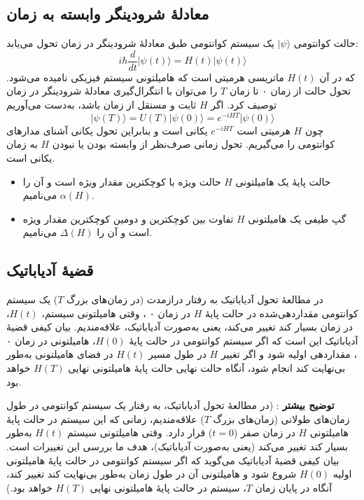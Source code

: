 \subsection{ معادلهٔ شرودینگر وابسته به زمان}
 حالت کوانتومی $|\psi\rangle$ یک سیستم کوانتومی طبق معادلهٔ شرودینگر در زمان تحول می‌یابد:
\begin{equation}
	i\hbar \frac{d}{dt}|\psi(t)\rangle = H(t)|\psi(t)\rangle
\end{equation}
که در آن $H(t)$ ماتریسی هرمیتی است که هامیلتونی سیستم فیزیکی نامیده می‌شود. تحول حالت از زمان ۰ تا زمان $T$ را می‌توان با انتگرال‌گیری معادلهٔ شرودینگر در زمان توصیف کرد. اگر $H$ ثابت و مستقل از زمان باشد، به‌دست می‌آوریم
\begin{equation}
	|\psi(T)\rangle = U(T)|\psi(0)\rangle = e^{-iHT}|\psi(0)\rangle
\end{equation}
چون $H$ هرمیتی است $e^{-iHT}$ یکانی است و بنابراین تحول یکانی آشنای مدارهای کوانتومی را می‌گیریم. تحول زمانی صرف‌نظر از وابسته بودن یا نبودن $H$ به زمان یکانی است.
\begin{itemize}
	\item 
	حالت پایهٔ یک هامیلتونی $H$ حالت ویژه‌ با کوچکترین مقدار ویژه‌ است و آن را $\alpha(H)$ می‌نامیم. 
	\item
	گپ طیفی یک هامیلتونی $H$ تفاوت بین کوچکترین و دومین کوچکترین مقدار ویژه‌ است و آن را $\Delta(H)$ می‌نامیم.
\end{itemize}

\subsection{ قضیهٔ آدیاباتیک}
در مطالعهٔ تحول آدیاباتیک به رفتار درازمدت (در زمان‌های بزرگ $T$) یک سیستم کوانتومی مقداردهی‌شده در حالت پایهٔ $H$ در زمان
 ۰ ،
وقتی هامیلتونی سیستم، $H(t)$، در زمان بسیار کند تغییر می‌کند، یعنی به‌صورت آدیاباتیک، علاقه‌مندیم. بیان کیفی قضیهٔ آدیاباتیک این است که اگر سیستم کوانتومی در حالت پایهٔ $H(0)$، هامیلتونی در زمان
 $۰$، 
مقداردهی اولیه شود و اگر تغییر $H$ در طول مسیر $H(t)$ در فضای هامیلتونی به‌طور بی‌نهایت کند انجام شود، آنگاه حالت نهایی حالت پایهٔ هامیلتونی نهایی $H(T)$ خواهد بود.

\textbf{توضیح بیشتر} :
(در مطالعهٔ تحول آدیاباتیک، به رفتار یک سیستم کوانتومی در طول زمان‌های طولانی (زمان‌های بزرگ $T$) علاقه‌مندیم، زمانی که این سیستم در حالت پایهٔ هامیلتونی $H$ در زمان صفر ($t=0$) قرار دارد. وقتی هامیلتونی سیستم $H(t)$ به‌طور بسیار کند تغییر می‌کند (یعنی به‌صورت آدیاباتیک)، هدف ما بررسی این تغییرات است. بیان کیفی قضیهٔ آدیاباتیک می‌گوید که اگر سیستم کوانتومی در حالت پایهٔ هامیلتونی اولیه $H(0)$ شروع شود و هامیلتونی آن در طول زمان به‌طور بی‌نهایت کند تغییر کند، آنگاه در پایان زمان $T$، سیستم در حالت پایهٔ هامیلتونی نهایی $H(T)$ خواهد بود.) 


